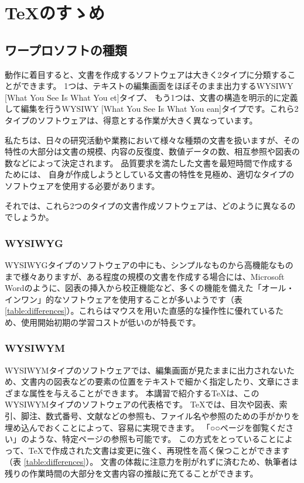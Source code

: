 \documentclass[TeXworkshop]{subfiles}
\begin{document}
\clearpage

\section{\TeX のすゝめ}
\subsection{ワープロソフトの種類}
動作に着目すると、文書を作成するソフトウェアは大きく2タイプに分類することができます。
1つは、テキストの編集画面をほぼそのまま出力するWYSIWY [What You See Is What You et]タイプ、
もう1つは、文書の構造を明示的に定義して編集を行うWYSIWY [What You See Is What You ean]タイプです。これら2タイプのソフトウェアは、得意とする作業が大きく異なっています。


私たちは、日々の研究活動や業務において様々な種類の文書を扱いますが、その特性の大部分は文書の規模、内容の反復度、数値データの数、相互参照や図表の数などによって決定されます。
品質要求を満たした文書を最短時間で作成するためには、
自身が作成しようとしている文書の特性を見極め、適切なタイプのソフトウェアを使用する必要があります。

それでは、これら2つのタイプの文書作成ソフトウェアは、どのように異なるのでしょうか。

\subsubsection{WYSIWYG}
WYSIWYGタイプのソフトウェアの中にも、シンプルなものから高機能なものまで様々ありますが、ある程度の規模の文書を作成する場合には、Microsoft Wordのように、図表の挿入から校正機能など、多くの機能を備えた「オール・インワン」的なソフトウェアを使用することが多いようです（表 \ref{table:differences}）。これらはマウスを用いた直感的な操作性に優れているため、使用開始初期の学習コストが低いのが特長です。


\subsubsection{WYSIWYM}
WYSIWYMタイプのソフトウェアでは、編集画面が見たままに出力されないため、文書内の図表などの要素の位置をテキストで細かく指定したり、文章にさまざまな属性を与えることができます。
本講習で紹介する\TeX は、このWYSIWYMタイプのソフトウェアの代表格です。
\TeX では、目次や図表、索引、脚注、数式番号、文献などの参照も、ファイル名や参照のための手がかりを埋め込んでおくことによって、容易に実現できます。
「○○ページを御覧ください」のような、特定ページの参照も可能です。
この方式をとっていることによって、\TeX で作成された文書は変更に強く、再現性を高く保つことができます（表 \ref{table:differences}）。 
文書の体裁に注意力を削がれずに済むため、執筆者は残りの作業時間の大部分を文書内容の推敲に充てることができます。
\end{document}

